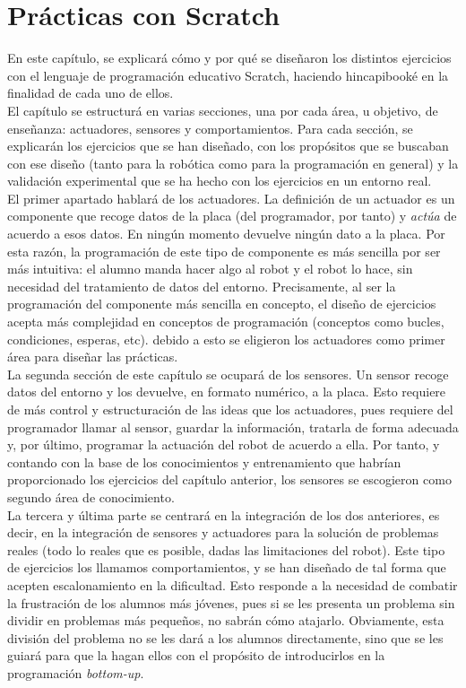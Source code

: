\chapter{Prácticas con Scratch}
\label{cap:scratch}
En este capítulo, se explicará cómo y por qué se diseñaron los distintos ejercicios con el lenguaje de programación educativo Scratch, haciendo hincapibooké en la finalidad de cada uno de ellos. \\
El capítulo se estructurá en varias secciones, una por cada área, u objetivo, de enseñanza: actuadores, sensores y comportamientos. Para cada sección, se explicarán los ejercicios que se han diseñado, con los propósitos que se buscaban con ese diseño (tanto para la robótica como para la programación en general) y la validación experimental que se ha hecho con los ejercicios en un entorno real.\\
El primer apartado hablará de los actuadores. La definición de un actuador es un componente que recoge datos de la placa (del programador, por tanto) y \textit{actúa} de acuerdo a esos datos. En ningún momento devuelve ningún dato a la placa. Por esta razón, la programación de este tipo de componente es más sencilla por ser más intuitiva: el alumno manda hacer algo al robot y el robot lo hace, sin necesidad del tratamiento de datos del entorno. Precisamente, al ser la programación del componente más sencilla en concepto, el diseño de ejercicios acepta más complejidad en conceptos de programación (conceptos como bucles, condiciones, esperas, etc). debido a esto se eligieron los actuadores como primer área para diseñar las prácticas.\\
La segunda sección de este capítulo se ocupará de los sensores. Un sensor recoge datos del entorno y los devuelve, en formato numérico, a la placa. Esto requiere de más control y estructuración de las ideas que los actuadores, pues requiere del programador llamar al sensor, guardar la información, tratarla de forma adecuada y, por último, programar la actuación del robot de acuerdo a ella. Por tanto, y contando con la base de los conocimientos y entrenamiento que habrían proporcionado los ejercicios del capítulo anterior, los sensores se escogieron como segundo área de conocimiento.\\
La tercera y última parte se centrará en la integración de los dos anteriores, es decir, en la integración de sensores y actuadores para la solución de problemas reales (todo lo reales que es posible, dadas las limitaciones del robot). Este tipo de ejercicios los llamamos comportamientos, y se han diseñado de tal forma que acepten escalonamiento en la dificultad. Esto responde a la necesidad de combatir la frustración de los alumnos más jóvenes, pues si se les presenta un problema sin dividir en problemas más pequeños, no sabrán cómo atajarlo. Obviamente, esta división del problema no se les dará a los alumnos directamente, sino que se les guiará para que la hagan ellos con el propósito de introducirlos en la programación \textit{bottom-up}.
























